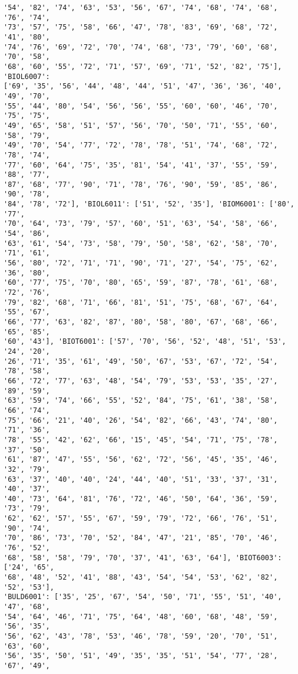 \documentclass[11pt]{article}
\begin{document}
\begin{Verbatim}[commandchars=\\\{\}]
'54', '82', '74', '63', '53', '56', '67', '74', '68', '74', '68', '76', '74',
'73', '57', '75', '58', '66', '47', '78', '83', '69', '68', '72', '41', '80',
'74', '76', '69', '72', '70', '74', '68', '73', '79', '60', '68', '70', '58',
'68', '60', '55', '72', '71', '57', '69', '71', '52', '82', '75'], 'BIOL6007':
['69', '35', '56', '44', '48', '44', '51', '47', '36', '36', '40', '49', '70',
'55', '44', '80', '54', '56', '56', '55', '60', '60', '46', '70', '75', '75',
'49', '65', '58', '51', '57', '56', '70', '50', '71', '55', '60', '58', '79',
'49', '70', '54', '77', '72', '78', '78', '51', '74', '68', '72', '78', '74',
'77', '60', '64', '75', '35', '81', '54', '41', '37', '55', '59', '88', '77',
'87', '68', '77', '90', '71', '78', '76', '90', '59', '85', '86', '90', '78',
'84', '78', '72'], 'BIOL6011': ['51', '52', '35'], 'BIOM6001': ['80', '77',
'70', '64', '73', '79', '57', '60', '51', '63', '54', '58', '66', '54', '86',
'63', '61', '54', '73', '58', '79', '50', '58', '62', '58', '70', '71', '61',
'56', '80', '72', '71', '71', '90', '71', '27', '54', '75', '62', '36', '80',
'60', '77', '75', '70', '80', '65', '59', '87', '78', '61', '68', '72', '76',
'79', '82', '68', '71', '66', '81', '51', '75', '68', '67', '64', '55', '67',
'66', '77', '63', '82', '87', '80', '58', '80', '67', '68', '66', '65', '85',
'60', '43'], 'BIOT6001': ['57', '70', '56', '52', '48', '51', '53', '24', '20',
'26', '71', '35', '61', '49', '50', '67', '53', '67', '72', '54', '78', '58',
'66', '72', '77', '63', '48', '54', '79', '53', '53', '35', '27', '89', '59',
'63', '59', '74', '66', '55', '52', '84', '75', '61', '38', '58', '66', '74',
'75', '66', '21', '40', '26', '54', '82', '66', '43', '74', '80', '71', '36',
'78', '55', '42', '62', '66', '15', '45', '54', '71', '75', '78', '37', '50',
'61', '87', '47', '55', '56', '62', '72', '56', '45', '35', '46', '32', '79',
'63', '37', '40', '40', '24', '44', '40', '51', '33', '37', '31', '40', '37',
'40', '73', '64', '81', '76', '72', '46', '50', '64', '36', '59', '73', '79',
'62', '62', '57', '55', '67', '59', '79', '72', '66', '76', '51', '90', '74',
'70', '86', '73', '70', '52', '84', '47', '21', '85', '70', '46', '76', '52',
'68', '58', '58', '79', '70', '37', '41', '63', '64'], 'BIOT6003': ['24', '65',
'68', '48', '52', '41', '88', '43', '54', '54', '53', '62', '82', '52', '53'],
'BULD6001': ['35', '25', '67', '54', '50', '71', '55', '51', '40', '47', '68',
'54', '64', '46', '71', '75', '64', '48', '60', '68', '48', '59', '56', '35',
'56', '62', '43', '78', '53', '46', '78', '59', '20', '70', '51', '63', '60',
'56', '35', '50', '51', '49', '35', '35', '51', '54', '77', '28', '67', '49',

\end{Verbatim}
\end{document}
